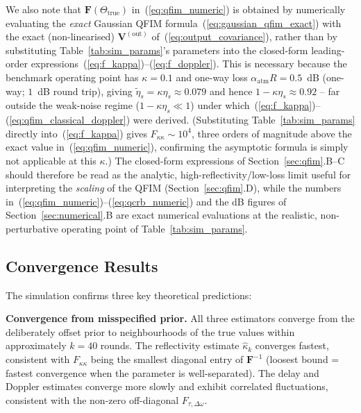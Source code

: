 \documentclass[journal]{IEEEtran}
\begin{document}
We also note that $\mathbf F(\Theta_{\text{true}})$ in~(\ref{eq:qfim_numeric}) is obtained by numerically evaluating the \emph{exact} Gaussian QFIM formula~(\ref{eq:gaussian_qfim_exact}) with the exact (non-linearised) $\mathbf V^{(\text{out})}$ of~(\ref{eq:output_covariance}), rather than by substituting Table~\ref{tab:sim_params}'s parameters into the closed-form leading-order expressions~(\ref{eq:f_kappa})--(\ref{eq:f_doppler}). This is necessary because the benchmark operating point has $\kappa=0.1$ and one-way loss $\alpha_{\text{atm}}R=0.5$~dB (one-way; $1$~dB round trip), giving $\tilde\eta_s=\kappa\eta_s\approx0.079$ and hence $1-\kappa\eta_s\approx0.92$ -- far outside the weak-noise regime ($1-\kappa\eta_s\ll1$) under which~(\ref{eq:f_kappa})--(\ref{eq:qfim_classical_doppler}) were derived. (Substituting Table~\ref{tab:sim_params} directly into~(\ref{eq:f_kappa}) gives $F_{\kappa\kappa}\sim10^4$, three orders of magnitude above the exact value in~(\ref{eq:qfim_numeric}), confirming the asymptotic formula is simply not applicable at this $\kappa$.) The closed-form expressions of Section~\ref{sec:qfim}.B--C should therefore be read as the analytic, high-reflectivity/low-loss limit useful for interpreting the \emph{scaling} of the QFIM (Section~\ref{sec:qfim}.D), while the numbers in~(\ref{eq:qfim_numeric})--(\ref{eq:qcrb_numeric}) and the dB figures of Section~\ref{sec:numerical}.B are exact numerical evaluations at the realistic, non-perturbative operating point of Table~\ref{tab:sim_params}.

\subsection{Convergence Results}

The simulation confirms three key theoretical predictions:

\textbf{Convergence from misspecified prior.} All three estimators converge from the deliberately offset prior to neighbourhoods of the true values within approximately $k = 40$ rounds. The reflectivity estimate $\hat{\kappa}_k$ converges fastest, consistent with $F_{\kappa\kappa}$ being the smallest diagonal entry of $\mathbf{F}^{-1}$ (loosest bound = fastest convergence when the parameter is well-separated). The delay and Doppler estimates converge more slowly and exhibit correlated fluctuations, consistent with the non-zero off-diagonal $F_{\tau,\Delta\omega}$.
\end{document}
